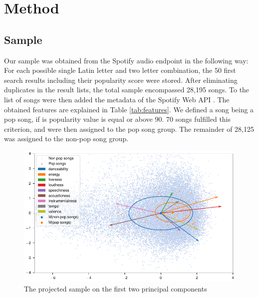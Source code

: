 \documentclass{article}
\begin{document}
\section{Method}


\subsection{Sample}
Our sample was obtained from the Spotify audio endpoint in the following way: For each possible single Latin letter and two letter combination, the 50 first search results including their popularity score were stored. After eliminating duplicates in the result lists, the total sample encompassed 28,195 songs. To the list of songs were then added the metadata of the Spotify Web API \citep{spotifyDocu}.
The obtained features are explained in Table \ref{tab:features}. We defined a song being a pop song, if is popularity value is equal or above 90. 70 songs fulfilled this criterion, and were then assigned to the pop song group. The remainder of 28,125 was assigned to the non-pop song group. 

\begin{figure}
  \centering
  \includegraphics[]{../fig/001_pca.pdf}
  \caption{The projected sample on the first two principal components}
  \label{fig:pca}
\end{figure}
\end{document}

